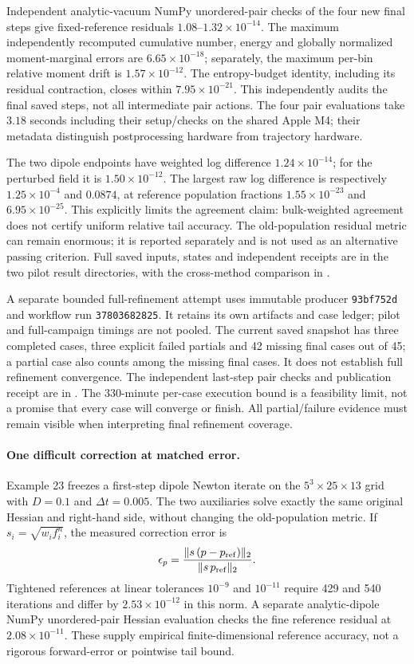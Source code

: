 \documentclass[11pt,letterpaper]{article}
\begin{document}
Independent analytic-vacuum NumPy unordered-pair checks of the four new final
steps give fixed-reference residuals $1.08$--$1.32\times10^{-14}$.
The maximum independently recomputed cumulative number, energy and globally
normalized moment-marginal errors are $6.65\times10^{-18}$; separately, the
maximum per-bin relative moment drift is $1.57\times10^{-12}$.
The entropy-budget identity, including its residual contraction, closes within
$7.95\times10^{-21}$. This independently audits the final saved steps, not
all intermediate pair actions. The four pair evaluations take $3.18$ seconds
including their setup/checks on the shared Apple M4; their metadata distinguish
postprocessing hardware from trajectory hardware.

The two dipole endpoints have weighted log difference $1.24\times10^{-14}$;
for the perturbed field it is $1.50\times10^{-12}$. The largest raw log
difference is respectively $1.25\times10^{-4}$ and $0.0874$, at reference
population fractions $1.55\times10^{-23}$ and $6.95\times10^{-25}$.
This explicitly limits the agreement claim: bulk-weighted agreement does not
certify uniform relative tail accuracy. The old-population residual metric
can remain enormous; it is reported separately and is not used as an
alternative passing criterion. Full saved inputs, states and independent
receipts are in the two pilot result directories, with the cross-method
comparison in .

A separate bounded full-refinement attempt uses immutable producer
\texttt{93bf752d} and workflow run \texttt{37803682825}. It retains its own
artifacts and case ledger; pilot and full-campaign timings are not pooled.
The current saved snapshot has three completed cases, three explicit failed
partials and 42 missing final cases out of 45; a partial case also counts
among the missing final cases. It does not establish full refinement
convergence. The independent last-step pair checks and publication receipt
are in .
The 330-minute per-case execution bound is a feasibility limit, not a promise
that every case will converge or finish. All partial/failure evidence must
remain visible when interpreting final refinement coverage.

\paragraph{One difficult correction at matched error.}
Example 23 freezes a first-step dipole Newton iterate on the
$5^3\times25\times13$ grid with $D=0.1$ and $\Delta t=0.005$.
The two auxiliaries solve exactly the same original Hessian and right-hand
side, without changing the old-population metric. If $s_i=\sqrt{w_i f_i^n}$,
the measured correction error is
\[
 \epsilon_p=\frac{\|s\,(p-p_{\rm ref})\|_2}{\|s\,p_{\rm ref}\|_2}.
\]
Tightened references at linear tolerances $10^{-9}$ and $10^{-11}$ require
429 and 540 iterations and differ by $2.53\times10^{-12}$ in this norm.
A separate analytic-dipole NumPy unordered-pair Hessian evaluation checks
the fine reference residual at $2.08\times10^{-11}$. These supply empirical
finite-dimensional reference accuracy, not a rigorous forward-error or
pointwise tail bound.
\end{document}
